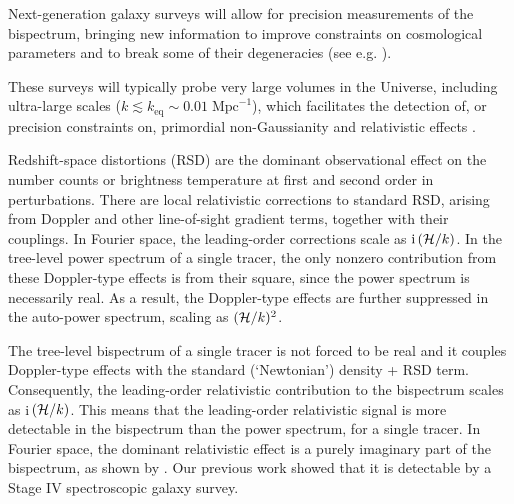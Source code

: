 {Next-generation galaxy surveys will allow for precision measurements of the  bispectrum, bringing new information to improve constraints on cosmological parameters and to break some of their degeneracies (see e.g. \cite{Scoccimarro:2015bla,Tellarini:2016sgp, Gil-Marin:2016wya,  Slepian:2016kfz,Gagrani:2016rfy, Sugiyama:2018yzo,Desjacques:2018pfv,Child:2018klv, Yankelevich:2018uaz, Schmit:2018rtf,DiDio:2018unb,Gualdi:2019ybt,Sarkar:2019ojl,Chudaykin:2019ock,Oddo:2019run, Sugiyama:2019ike,Philcox:2019hdi,Durrer:2020orn,Montanari:2020uez}). 

These surveys will typically probe very large volumes in the Universe, including ultra-large scales ($k\lesssim k_{\mathrm{eq}} \sim 0.01\;\mathrm{Mpc}^{-1}$), which facilitates the detection of, or precision constraints on, primordial non-Gaussianity \cite{Tellarini:2015faa,Watkinson:2017zbs,Majumdar:2017tdm,Karagiannis:2018jdt,Karagiannis:2019jjx,Bharadwaj:2020wkc}
and relativistic effects
\cite{Kehagias:2015tda,Umeh:2016nuh, DiDio:2016gpd, Jolicoeur:2017nyt,Bertacca:2017dzm,Jolicoeur:2017eyi,Koyama:2018ttg,Clarkson:2018dwn,Maartens:2019yhx,Jeong:2019igb}.
 
Redshift-space distortions (RSD) are the dominant observational effect on the number counts or brightness temperature at first and second order in perturbations. There are local relativistic corrections to standard RSD, arising from Doppler and other line-of-sight gradient terms, together with their couplings.  In Fourier space, the leading-order corrections  scale as $\mathrm{i\,}(\mathcal{H}/k)$. In the tree-level power spectrum of a single tracer, the only nonzero contribution from these Doppler-type effects is from their square, since the power spectrum is necessarily real. As a result, the Doppler-type effects are further suppressed in the auto-power spectrum, scaling as  $(\mathcal{H}/k)^2$. 

The tree-level bispectrum of a single tracer is not forced to be real and it couples Doppler-type effects with the standard (`Newtonian') density + RSD term. Consequently, the leading-order relativistic contribution to the bispectrum scales as i\,$(\mathcal{H}/k)$. 
This means that the leading-order relativistic signal is more detectable in the bispectrum than the power spectrum, for a single tracer.
In Fourier space, the dominant relativistic effect is a purely imaginary part of the bispectrum, as shown by \cite{Clarkson:2018dwn,Maartens:2019yhx}. Our previous work \cite{Maartens:2019yhx} showed that it is detectable by a Stage IV spectroscopic galaxy survey.

}
